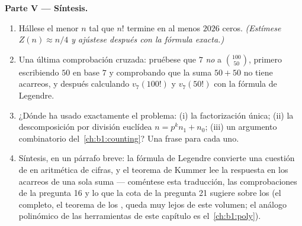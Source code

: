 \begin{problem}
\medskip
\noindent\textbf{Parte V --- Síntesis.}
\begin{enumerate}[resume]
  \item Hállese el menor $n$ tal que $n!$ termine en al menos $2026$
        ceros. \emph{(Estímese $Z(n) \approx n/4$ y ajústese después
        con la fórmula exacta.)}
  \item Una última comprobación cruzada: pruébese que $7$ \emph{no}
         a $\binom{100}{50}$, primero escribiendo $50$ en base
        $7$ y comprobando que la suma $50 + 50$ no tiene acarreos, y
        después calculando $v_7(100!)$ y $v_7(50!)$ con la fórmula de
        Legendre.
  \item ¿Dónde ha usado exactamente el problema: (i) la factorización
        única; (ii) la descomposición por división euclídea
        $n = p^k n_1 + n_0$; (iii) un argumento combinatorio
        del~\cref{ch:b1:counting}? Una frase para cada uno.
  \item Síntesis, en un párrafo breve: la fórmula de Legendre
        convierte una cuestión de  en aritmética de
        cifras, y el teorema de Kummer lee la respuesta en los
        acarreos de una sola suma --- coméntese esta traducción, las
        comprobaciones de la pregunta 16 y lo que la cota de la
        pregunta 21 sugiere sobre los  (el  completo,
        el teorema de los , queda muy lejos de este
        volumen; el análogo polinómico de las herramientas de este
        capítulo es el~\cref{ch:b1:poly}).
\end{enumerate}
\end{problem}
